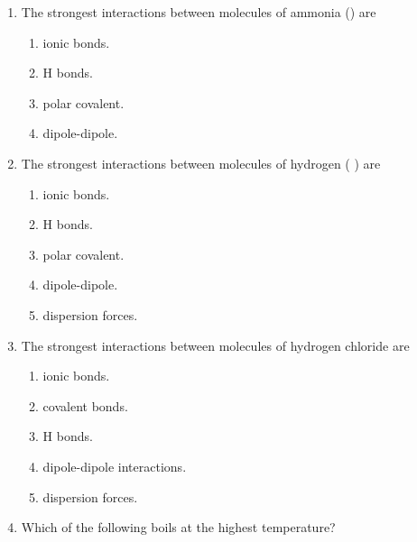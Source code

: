\documentclass[main.tex]{subfiles}
\begin{document}
\begin{fullwidth}
\begin{multicols*}{2}
\begin{enumerate}
		
\item The strongest interactions between molecules of ammonia () are
\begin{enumerate}[label=(\alph*)]
\item  ionic bonds.
\item  H bonds.
\item  polar covalent.
\item  dipole-dipole.
\end{enumerate} 

		
\item The strongest interactions between molecules of hydrogen ( ) are
\begin{enumerate}[label=(\alph*)]
\item  ionic bonds.
\item  H bonds.
\item  polar covalent.
\item  dipole-dipole.
\item  dispersion forces.
\end{enumerate} 
		
\item The strongest interactions between molecules of hydrogen chloride are
\begin{enumerate}[label=(\alph*)]
\item  ionic bonds.
\item  covalent bonds.
\item  H bonds.
\item  dipole-dipole interactions.
\item  dispersion forces.
\end{enumerate} 

\item Which of the following boils at the highest temperature?
\begin{enumerate}[label=(\alph*)]\vspace{-0.5cm}
\end{enumerate}\vspace{-0.5cm}


\end{enumerate}
\end{multicols*}
\end{fullwidth}
\end{document}
